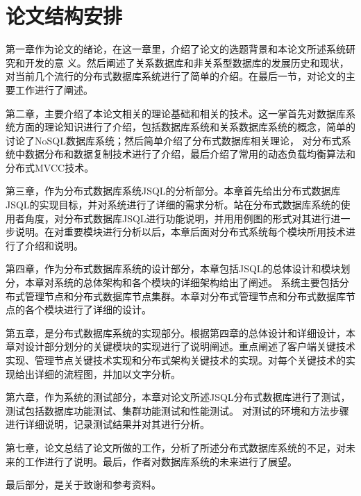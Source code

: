 \section{论文结构安排}
第一章作为论文的绪论，在这一章里，介绍了论文的选题背景和本论文所述系统研究和开发的意
义。然后阐述了关系数据库和非关系型数据库的发展历史和现状，对当前几个流行的分布式数据库系统进行了简单的介绍。在最后一节，对论文的主要工作进行了阐述。

第二章，主要介绍了本论文相关的理论基础和相关的技术。这一掌首先对数据库系统方面的理论知识进行了介绍，包括数据库系统和关系数据库系统的概念，简单的讨论了NoSQL数据库系统；然后简单介绍了分布式数据库相关理论，
对分布式系统中数据分布和数据复制技术进行了介绍，最后介绍了常用的动态负载均衡算法和分布式MVCC技术。

第三章，作为分布式数据库系统JSQL的分析部分。本章首先给出分布式数据库JSQL的实现目标，并对系统进行了详细的需求分析。站在分布式数据库系统的使用者角度，对分布式数据库JSQL进行功能说明，并用用例图的形式对其进行进一步说明。在对重要模块进行分析以后，本章后面对分布式系统每个模块所用技术进行了介绍和说明。

第四章，作为分布式数据库系统的设计部分，本章包括JSQL的总体设计和模块划分，本章对系统的总体架构和各个模块的详细架构给出了阐述。
系统主要包括分布式管理节点和分布式数据库节点集群。本章对分布式管理节点和分布式数据库节点的各个模块进行了详细的设计。

第五章，是分布式数据库系统的实现部分。根据第四章的总体设计和详细设计，本章对设计部分划分的关键模块的实现进行了说明阐述。重点阐述了客户端关键技术实现、管理节点关键技术实现和分布式架构关键技术的实现。对每个关键技术的实现给出详细的流程图，并加以文字分析。

第六章，作为系统的测试部分，本章对论文所述JSQL分布式数据库进行了测试，测试包括数据库功能测试、集群功能测试和性能测试。
对测试的环境和方法步骤进行详细说明，记录测试结果并对其进行分析。

第七章，论文总结了论文所做的工作，分析了所述分布式数据库系统的不足，对未来的工作进行了说明。最后，作者对数据库系统的未来进行了展望。

最后部分，是关于致谢和参考资料。